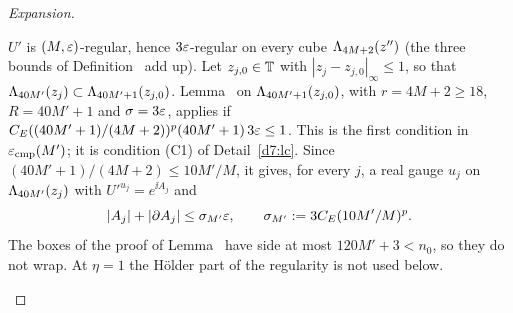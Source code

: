 \begin{proof}[Expansion]
\begin{step}
$U'$ is $(M,\varepsilon)$-regular, hence $3\varepsilon$-regular on every cube $\Lambda_{4M+2}(z'')$ (the three bounds of Definition~ add up). Let $z_{j,0}\in\mathbb T$ with $|z_j-z_{j,0}|_\infty\le1$, so that $\Lambda_{40M'}(z_j)\subset\Lambda_{40M'+1}(z_{j,0})$. Lemma~ on $\Lambda_{40M'+1}(z_{j,0})$, with $r=4M+2\ge18$, $R=40M'+1$ and $\sigma=3\varepsilon$, applies if $C_E((40M'+1)/(4M+2))^p(40M'+1)\,3\varepsilon\le1$. This is the first condition in $\varepsilon_{\rm cmp}(M')$; it is condition (C1) of Detail~\ref{d7:lc}. Since $(40M'+1)/(4M+2)\le10M'/M$, it gives, for every $j$, a real gauge $u_j$ on $\Lambda_{40M'}(z_j)$ with $U'^{u_j}=e^{\ii A_j}$ and
\[
|A_j|+|\partial A_j|\le\sigma_{M'}\varepsilon,\qquad\sigma_{M'}:=3C_E(10M'/M)^p .
\]
The boxes of the proof of Lemma~ have side at most $120M'+3<n_0$, so they do not wrap. At $\eta=1$ the H\"older part of the regularity is not used below.
\end{step}


\end{proof}
